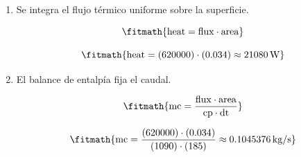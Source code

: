 \begin{enumerate}

\item Se integra el flujo térmico uniforme sobre la superficie.

\[\fitmath{\mathrm{heat}=\mathrm{flux}\cdot \mathrm{area}}\]

\[\fitmath{\mathrm{heat}=(620000)\cdot (0.034)\approx 21080\,\mathrm{W}}\]

\item El balance de entalpía fija el caudal.

\[\fitmath{\mathrm{mc}=\frac{\mathrm{flux}\cdot \mathrm{area}}{\mathrm{cp}\cdot \mathrm{dt}}}\]

\[\fitmath{\mathrm{mc}=\frac{(620000)\cdot (0.034)}{(1090)\cdot (185)}\approx 0.1045376\,\mathrm{kg/s}}\]

\end{enumerate}
